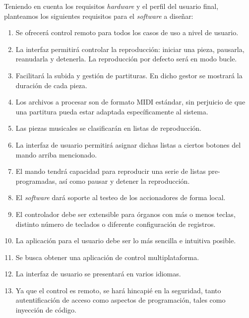 Teniendo en cuenta los requisitos \textit{hardware} y el perfil del usuario final, planteamos los siguientes requisitos para el \textit{software} a diseñar:

\begin{enumerate}

	\item Se ofrecerá control remoto para todos los casos de uso a nivel de usuario.
	
	\item La interfaz permitirá controlar la reproducción: iniciar una pieza, pausarla, reanudarla y detenerla. La reproducción por defecto será en modo bucle.
	
	\item Facilitará la subida y gestión de partituras. En dicho gestor se mostrará la duración de cada pieza.
	
	\item Los archivos a procesar son de formato \acrshort{MIDI} estándar, sin perjuicio de que una partitura pueda estar adaptada específicamente al sistema.
	
	\item Las piezas musicales se clasificarán en listas de reproducción.
	
	\item La interfaz de usuario permitirá asignar dichas listas a ciertos botones del mando arriba mencionado.
	
	\item El mando tendrá capacidad para reproducir una serie de listas pre-programadas, así como pausar y detener la reproducción.
	
	\item El \textit{software} dará soporte al testeo de los accionadores de forma local.
	
	\item El controlador debe ser extensible para órganos con más o menos teclas, distinto número de teclados o diferente configuración de registros.
	
	\item La aplicación para el usuario debe ser lo más sencilla e intuitiva posible.
	
	\item Se busca obtener una aplicación de control multiplataforma.
	
	\item La interfaz de usuario se presentará en varios idiomas.
	
	\item Ya que el control es remoto, se hará hincapié en la seguridad, tanto autentificación de acceso como aspectos de programación, tales como inyección de código.

\end{enumerate}

